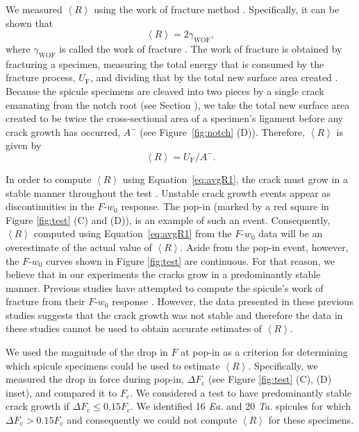 \documentclass[12pt,onecolumn]{article}
\makeatletter
\DeclareRobustCommand*{\nameref}[1]{%
      \emph{\myorg@nameref{#1}}%
    }%
\newcommand{\TA}{\textit{Ta.\@}\xspace}
\newcommand{\EA}{\textit{Ea.\@}\xspace}
\makeatother
\begin{document}
\begin{bibunit}
We measured $\left< R\right>$ using the work of fracture method \cite{nakayama1981crack,sakai1992work}. Specifically, it can be shown that 
%
\begin{equation}
    \label{eq:Rwof}
    \left< R \right>=2 \gamma_\mathrm{WOF},
\end{equation}
%
where $\gamma_\mathrm{WOF}$ is called the work of fracture \cite{sakai1992work}. The work of fracture is obtained by fracturing a specimen, measuring the total energy that is consumed by the fracture process, $U_\mathrm{F}$, and dividing that by the total new surface area created \cite{nakayama1981crack}. Because the spicule specimens are cleaved into two pieces by a single crack emanating from the notch root (see Section \nameref{sec:fracto}), we take the total new surface area created to be twice the cross-sectional area of a specimen's ligament before any crack growth has occurred, $A^-$ (see Figure~\ref{fig:notch} (D)). Therefore, $\left< R \right>$ is given by 
%
\begin{equation}
    \label{eq:avgR1}
    \left< R \right> = U_\mathrm{F}/A^-.
\end{equation}
%

In order to compute $\left< R \right>$ using Equation~\eqref{eq:avgR1}, the crack must grow in a stable manner throughout the test \cite{tattersall1966work,davidge1968effective}. Unstable crack growth events appear as discontinuities in the $F$-$w_0$ response. The pop-in (marked by a red square in Figure \ref{fig:test} (C) and (D)), is an example of such an event. Consequently, $\left< R \right>$ computed using Equation~\eqref{eq:avgR1} from the $F$-$w_0$ data will be an overestimate of the actual value of $\left< R \right>$. Aside from the pop-in event, however, the $F$-$w_0$ curves shown in Figure \ref{fig:test} are continuous. For that reason, we believe that in our experiments the cracks grow in a predominantly stable manner. Previous studies have attempted to compute the spicule's work of fracture from their $F$-$w_0$ response \cite{walter2007mechanisms, mayer2005rigid}. However, the data presented in these previous studies suggests that the crack growth was not stable and therefore the data in these studies cannot be used to obtain accurate estimates of $\left< R \right>$. 

We used the magnitude of the drop in $F$ at pop-in as a criterion for determining which spicule specimens could be used to estimate $\left< R\right>$. Specifically, we measured the drop in force during pop-in, $\Delta F_\mathrm{c}$ (see Figure \ref{fig:test} (C), (D) inset), and compared it to $F_\mathrm{c}$. We considered a test to have predominantly stable crack growth if $\Delta F_\mathrm{c} \leq 0.15 F_\mathrm{c}$. We identified 16 \EA and 20 \TA spicules for which $\Delta F_\mathrm{c} > 0.15 F_\mathrm{c}$ and consequently we could not compute $\left< R \right>$ for these specimens.


\end{bibunit}
\end{document}
